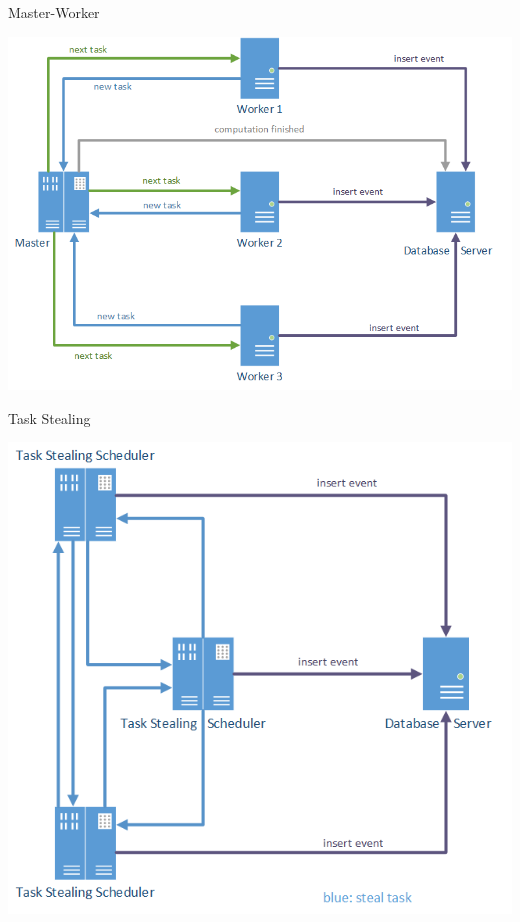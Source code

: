 

	\begin{frame}{Master-Worker}
		\centerline{\includegraphics[scale=0.5]{images/master}}
	\end{frame}
	\begin{frame}{Task Stealing}
		\centerline{\includegraphics[scale=0.5]{images/taskstealing}}
	\end{frame}


